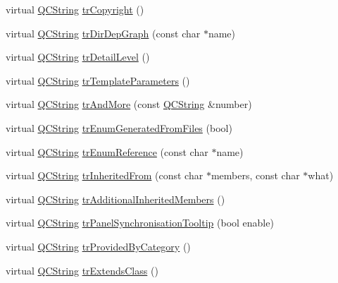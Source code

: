 \begin{DoxyCompactItemize}
\item 
virtual \mbox{\hyperlink{class_q_c_string}{Q\+C\+String}} \mbox{\hyperlink{class_translator_japanese_a1d736d77bc42bc6cc37db2f620ff9121}{tr\+Copyright}} ()
\item 
virtual \mbox{\hyperlink{class_q_c_string}{Q\+C\+String}} \mbox{\hyperlink{class_translator_japanese_a00e1b37754ca0a80039aa712b4ba1118}{tr\+Dir\+Dep\+Graph}} (const char $\ast$name)
\item 
virtual \mbox{\hyperlink{class_q_c_string}{Q\+C\+String}} \mbox{\hyperlink{class_translator_japanese_a2777a4ec6aa939b008cbd34b9b084729}{tr\+Detail\+Level}} ()
\item 
virtual \mbox{\hyperlink{class_q_c_string}{Q\+C\+String}} \mbox{\hyperlink{class_translator_japanese_ad7d2c82a4ab7f02e45460179ec188464}{tr\+Template\+Parameters}} ()
\item 
virtual \mbox{\hyperlink{class_q_c_string}{Q\+C\+String}} \mbox{\hyperlink{class_translator_japanese_a54f7d9f13f719d351d583befbcfad9c2}{tr\+And\+More}} (const \mbox{\hyperlink{class_q_c_string}{Q\+C\+String}} \&number)
\item 
virtual \mbox{\hyperlink{class_q_c_string}{Q\+C\+String}} \mbox{\hyperlink{class_translator_japanese_a9a2691028093ed98f8ecb5b16e5903f7}{tr\+Enum\+Generated\+From\+Files}} (bool)
\item 
virtual \mbox{\hyperlink{class_q_c_string}{Q\+C\+String}} \mbox{\hyperlink{class_translator_japanese_a13eadac95c15f7cf42442940a0d5f944}{tr\+Enum\+Reference}} (const char $\ast$name)
\item 
virtual \mbox{\hyperlink{class_q_c_string}{Q\+C\+String}} \mbox{\hyperlink{class_translator_japanese_a3204ade1900029b4523906972c629b48}{tr\+Inherited\+From}} (const char $\ast$members, const char $\ast$what)
\item 
virtual \mbox{\hyperlink{class_q_c_string}{Q\+C\+String}} \mbox{\hyperlink{class_translator_japanese_a13b991d50c189d057a8fdb99763b8f98}{tr\+Additional\+Inherited\+Members}} ()
\item 
virtual \mbox{\hyperlink{class_q_c_string}{Q\+C\+String}} \mbox{\hyperlink{class_translator_japanese_a26c13eefdf17423eb2f7a04eb7416894}{tr\+Panel\+Synchronisation\+Tooltip}} (bool enable)
\item 
virtual \mbox{\hyperlink{class_q_c_string}{Q\+C\+String}} \mbox{\hyperlink{class_translator_japanese_af2c9ab0ae3d70a4d00410f86665847b0}{tr\+Provided\+By\+Category}} ()
\item 
virtual \mbox{\hyperlink{class_q_c_string}{Q\+C\+String}} \mbox{\hyperlink{class_translator_japanese_a95ed5aea5be1a95219829cf0bd920b5a}{tr\+Extends\+Class}} ()

\end{DoxyCompactItemize}
